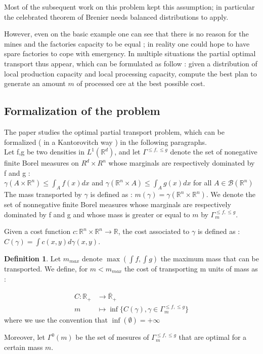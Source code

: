 \documentclass[a4paper,11pt]{article}
\theoremstyle{definition}
\newtheorem{definition}{Definition}
\begin{document}
Most of the subsequent work on this problem kept this assumption; in particular the celebrated theorem of Brenier \cite{Brenier} needs balanced distributions to apply. 

However, even on the basic example one can see that there is no reason for the mines and the factories capacity to be equal ; in reality one could hope to have spare factories to cope with emergency. In multiple situations the partial optimal transport thus appear, which can be formulated as follow : given a distribution of local production capacity and local processing capacity, compute the best plan to generate an amount $m$ of processed ore at the best possible cost. \\

\subsection{Formalization of the problem}
The paper studies the optimal partial transport problem, which can be formalized ( in a Kantorovitch \cite{Kant} way ) in the following paragraphs. \\

Let f,g be two densities in $L^1(\mathbb{R}^d)$, and let $\Gamma^{\leq f,\leq g}$ denote the set of nonegative finite Borel measures on $R^d \times R^n$ whose marginals are respectively dominated by f and g : \\

$\gamma (A \times \mathbb{R}^n) \leq \int_A{f(x)dx} $ and 
$\gamma (\mathbb{R}^n \times A) \leq \int_A{g(x)dx} $ for all $A \in \mathcal{B}(\mathbb{R}^n)$ \\

The mass transported by $\gamma$ is defined as : $m(\gamma) = \gamma(\mathbb R^n \times \mathbb R^n )$. We denote the set of nonnegative finite Borel measures whose marginals are respectively dominated by f and g and whose mass is greater or equal to $m$ by $\Gamma^{\leq f,\leq g}_m$.

Given a cost function $c:\mathbb R^n \times\mathbb R^n \rightarrow {\mathbb R}$, the cost associated to $\gamma$ is defined as : $C(\gamma) = \int{c(x,y)d\gamma(x,y)}$.
\begin{definition}
Let $m_{max}$ denote $\max(\int f, \int g)$ the maximum mass that can be transported. We define, for $m<m_{max}$ the cost of transporting m units of mass as : 

\begin{align*}
     C :  \mathbb R_+ &\to   \overline{\mathbb R}_+ \\
      m  &\mapsto  \inf \{ C(\gamma),\gamma \in \Gamma^{\leq f,\leq g}_m \}
\end{align*}
where we use the convention that $\inf (\emptyset) = +\infty$
\end{definition}
Moreover, let $\Gamma^0(m)$ be the set of mesures of $\Gamma^{\leq f,\leq g}_m$ that are optimal for a certain mass $m$.
\end{document}
